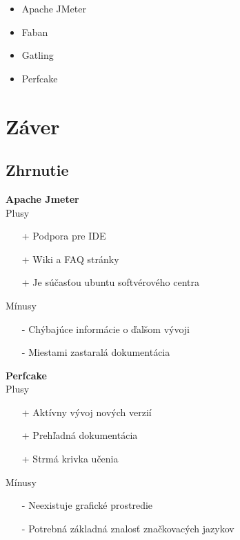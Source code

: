 \documentclass[12pt,oneside,final]{fithesis-utf8}
\begin{document}
\begin{itemize}

\item Apache JMeter

\item Faban

\item Gatling

\item Perfcake

\end{itemize}


\chapter{Záver}


\section{Zhrnutie}

\textbf{Apache Jmeter}
\newline \\
Plusy
\begin{itemize}
\item[+] Podpora pre IDE
\item[+] Wiki a FAQ stránky
\item[+] Je súčasťou ubuntu softvérového centra \\
\end{itemize}

\noindent Mínusy
\begin{itemize}
\item[-] Chýbajúce informácie o ďalšom vývoji
\item[-] Miestami zastaralá dokumentácia \\
\end{itemize}

\noindent \textbf{Perfcake}
\newline \\
Plusy
\begin{itemize}
\item[+] Aktívny vývoj nových verzií
\item[+] Prehľadná dokumentácia
\item[+] Strmá krivka učenia \\
\end{itemize}

\newpage

\noindent Mínusy
\begin{itemize}
\item[-] Neexistuje grafické prostredie
\item[-] Potrebná základná znalosť značkovacých jazykov \\
\end{itemize}
\end{document}
